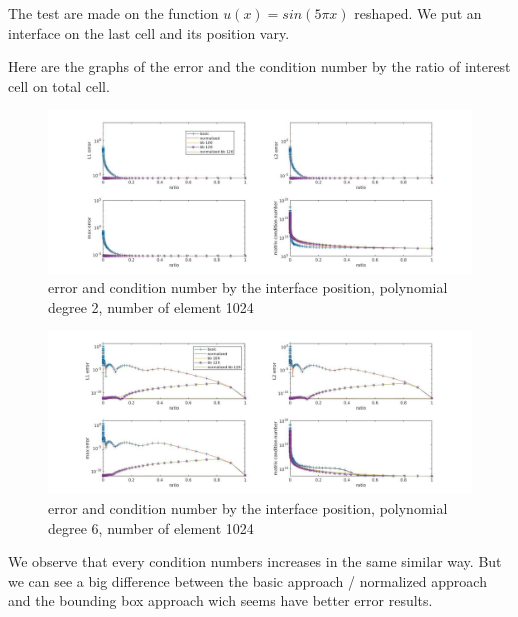 \documentclass[a4paper,10pt]{article}
\begin{document}
The test are made on the function $u(x) = sin(5\pi x)$ reshaped. We put an 
interface on the last cell and its position vary.

Here are the graphs of the error and the condition number by the ratio of 
interest cell on total cell.

\begin{figure}[hp!]
 \centering
\includegraphics[width=\textwidth]{figure/cond_N2_prec1024.jpg}
 \caption{error and condition number by the interface position, polynomial 
degree 2, number of element 1024}
\end{figure}

\begin{figure}[hp!]
 \centering
\includegraphics[width=\textwidth]{figure/cond_N6_prec1024.jpg}
 \caption{error and condition number by the interface position, polynomial 
degree 6, number of element 1024}
\end{figure}

We observe that every condition numbers increases in the same similar way. But 
we can see a big difference between the basic approach / normalized approach 
and the bounding box approach wich seems have better error results.
\end{document}
